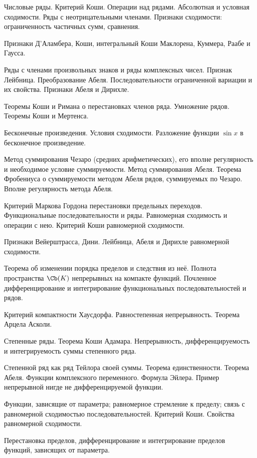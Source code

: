 \documentclass[a4paper]{article}
\begin{document}
\begin{nums}{-4}
\item Числовые ряды. Критерий Коши. Операции над рядами. Абсолютная и условная сходимости.
Ряды с неотрицательными членами. Признаки сходимости: ограниченность частичных сумм, сравнения.
\item Признаки Д'Аламбера, Коши, интегральный Коши Маклорена, Куммера, Раабе и Гаусса.
\item Ряды с членами произвольных знаков и ряды комплексных чисел. Признак Лейбница. Преобразование Абеля.
Последовательности ограниченной вариации и их свойства. Признаки Абеля и Дирихле.
\item Теоремы Коши и Римана о перестановках членов ряда. Умножение рядов. Теоремы Коши и Мертенса.
\item Бесконечные произведения. Условия сходимости. Разложение функции $\sin x$ в бесконечное произведение.
\item Метод суммирования Чезаро (средних арифметических), его вполне регулярность и необходимое условие суммируемости.
Метод суммирования Абеля. Теорема Фробениуса о суммируемости методом Абеля рядов, суммируемых по
Чезаро. Вполне регулярность метода Абеля.
\item Критерий Маркова Гордона перестановки предельных переходов. Функциональные последовательности и ряды.
Равномерная сходимость и операции с нею. Критерий Коши равномерной сходимости.
\item Признаки Вейерштрасса, Дини. Лейбница, Абеля и Дирихле равномерной сходимости.
\item Теорема об изменении порядка пределов и следствия из неё. Полнота пространства $\Cb(K)$ непрерывных на компакте функций.
Почленное дифференцирование и интегрирование функциональных последовательностей и рядов.
\item Критерий компактности Хаусдорфа. Равностепенная непрерывность. Теорема Арцела Асколи.
\item Степенные ряды. Теорема Коши Адамара. Непрерывность, дифференцируемость и интегрируемость суммы степенного ряда.
\item Степенной ряд как ряд Тейлора своей суммы. Теорема единственности. Теорема Абеля. Функции комплексного переменного.
Формула Эйлера. Пример непрерывной нигде не дифференцируемой функции.
\item Функции, зависящие от параметра; равномерное стремление к пределу; связь с равномерной сходимостью последовательностей.
Критерий Коши. Свойства равномерной сходимости.
\item Перестановка пределов, дифференцирование и интегрирование пределов функций, зависящих от параметра.

\end{nums}
\end{document}
